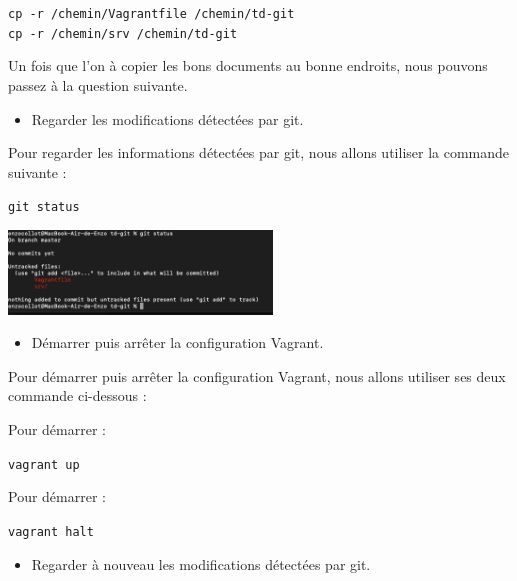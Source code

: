\documentclass[12pt]{article}
\begin{document}
\texttt{cp -r /chemin/Vagrantfile /chemin/td-git} \\
\texttt{cp -r /chemin/srv /chemin/td-git}

\vspace{0.3cm}

Un fois que l'on à copier les bons documents au bonne endroits, nous pouvons passez à la question suivante. 

\vspace{0.3cm}

\begin{itemize}
  \item Regarder les modifications détectées par git.
\end{itemize}

\vspace{0.3cm}

Pour regarder les informations détectées par git, nous allons utiliser la commande suivante : 

\texttt{git status}

\vspace{0.3cm}

\begin{center}
  \includegraphics[width=7cm]{Image-TD-Git-1/git-status.png}
\end{center}

\vspace{0.3cm}

\begin{itemize}
  \item Démarrer puis arrêter la configuration Vagrant.
\end{itemize}

Pour démarrer puis arrêter la configuration Vagrant, nous allons utiliser ses deux commande ci-dessous : \newline

Pour démarrer : 

\texttt{vagrant up}

Pour démarrer : 

\texttt{vagrant halt}

\vspace{0.3cm}

\newpage

\begin{itemize}
  \item Regarder à nouveau les modifications détectées par git.
\end{itemize}
\end{document}
